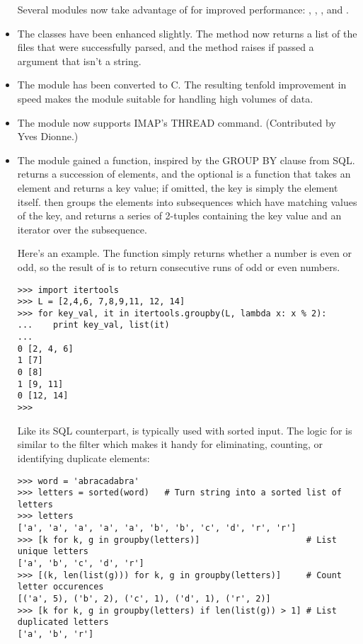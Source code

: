 \documentclass{howto}
\begin{document}
\begin{itemize}
Several modules now take advantage of  for
improved performance:  , , 
, and .

\item The  classes have been enhanced slightly.
   The  method now returns a list of the files that
   were successfully parsed, and the  method raises
    if passed a  argument that isn't a
   string.

\item The  module has been converted to C.  The resulting
   tenfold improvement in speed makes the module suitable for handling
   high volumes of data.

\item The  module now supports IMAP's THREAD command.
(Contributed by Yves Dionne.)

\item The  module gained a
   function,
  inspired by the GROUP BY clause from SQL.
   returns a succession of elements, and the optional
   is a function that takes an element and returns a key
  value; if omitted, the key is simply the element itself.
   then groups the elements into subsequences
  which have matching values of the key, and returns a series of 2-tuples
  containing the key value and an iterator over the subsequence.
 
Here's an example.  The  function simply returns whether a
number is even or odd, so the result of  is to
return consecutive runs of odd or even numbers.

\begin{verbatim}
>>> import itertools
>>> L = [2,4,6, 7,8,9,11, 12, 14]
>>> for key_val, it in itertools.groupby(L, lambda x: x % 2):
...    print key_val, list(it)
... 
0 [2, 4, 6]
1 [7]
0 [8]
1 [9, 11]
0 [12, 14]
>>> 
\end{verbatim}

Like its SQL counterpart,  is typically used with
sorted input.  The logic for  is similar to the
\UNIX{}  filter which makes it handy for eliminating,
counting, or identifying duplicate elements:

\begin{verbatim}
>>> word = 'abracadabra'
>>> letters = sorted(word)   # Turn string into a sorted list of letters
>>> letters 
['a', 'a', 'a', 'a', 'a', 'b', 'b', 'c', 'd', 'r', 'r']
>>> [k for k, g in groupby(letters)]                     # List unique letters
['a', 'b', 'c', 'd', 'r']
>>> [(k, len(list(g))) for k, g in groupby(letters)]     # Count letter occurences
[('a', 5), ('b', 2), ('c', 1), ('d', 1), ('r', 2)]
>>> [k for k, g in groupby(letters) if len(list(g)) > 1] # List duplicated letters
['a', 'b', 'r']
\end{verbatim}


\end{itemize}
\end{document}

